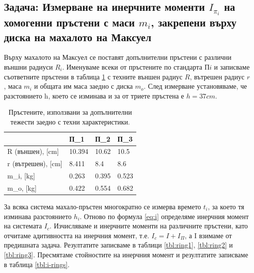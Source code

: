 \documentclass[12pt]{article}
\begin{document}
\subsection{Задача: Измерване на инерчните моменти $I_{\pi_i}$ на хомогенни пръстени с маси $m_i$, закрепени върху диска на махалото на Максуел}

Върху махалото на Максуел се поставят допълнителни пръстени с различни външни радиуси $R_i$. Именуваме всеки от пръстените по стандарта П$i$ и записваме съответните пръстени в таблица \ref{tbl:rings} с техните външен радиус $R$, вътрешен радиус $r$, маса $m_i$ и общата им маса заедно с диска $m_o$. След измерване установяваме, че разстоянието h, което се изминава и за от триете пръстена е $h=37 cm$.

\begin{table}[h]
\begin{center}
\begin{tabular}{|l|l|l|l|}\hline
 & П_1 & П_2 & П_3 \\ \hline
R (външен), [cm] & 10.394 & 10.62 & 10.5 \\ \hline
r (вътрешен), [cm] & 8.411 & 8.4 & 8.6 \\ \hline
m_i, [kg] & 0.263 & 0.395 & 0.523 \\ \hline
m_o, [kg] & 0.422 & 0.554 & 0.682 \\ \hline
\end{tabular}
\caption{\label{tbl:rings}Пръстените, използвани за допълнителни тежести заедно с техни характеристики.}
\end{center}
\end{table}

За всяка система махало-пръстен многократно се измерва времето $t_i$, за което тя изминава разстоянието $h_i$. Отново по формула \ref{eq:i} определяме инерчния момент на системата $I_c$. Изчисляваме и инерчните моменти на различните пръстени, като отчитаме адитивността на инерчния момент, т.е. $I_c = I + I_\Pi$, а I взимаме от предишната задача. Резултатите записваме в таблици \ref{tbl:ring1}, \ref{tbl:ring2} и \ref{tbl:ring3}. Пресмятаме стойностите на инерчния момент и резултатите записваме в таблица \ref{tbl:i-rings}.
\end{document}
